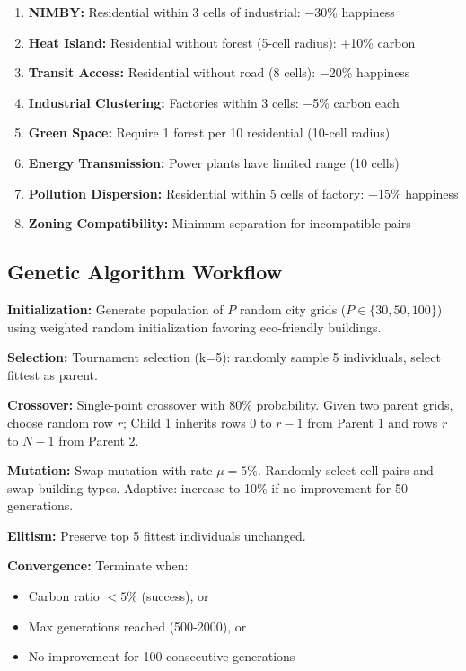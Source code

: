 \documentclass[conference]{IEEEtran}
\begin{document}
\begin{enumerate}
    \item \textbf{NIMBY:} Residential within 3 cells of industrial: $-$30\% happiness
    \item \textbf{Heat Island:} Residential without forest (5-cell radius): +10\% carbon
    \item \textbf{Transit Access:} Residential without road (8 cells): $-$20\% happiness
    \item \textbf{Industrial Clustering:} Factories within 3 cells: $-$5\% carbon each
    \item \textbf{Green Space:} Require 1 forest per 10 residential (10-cell radius)
    \item \textbf{Energy Transmission:} Power plants have limited range (10 cells)
    \item \textbf{Pollution Dispersion:} Residential within 5 cells of factory: $-$15\% happiness
    \item \textbf{Zoning Compatibility:} Minimum separation for incompatible pairs
\end{enumerate}

\subsection{Genetic Algorithm Workflow}

\textbf{Initialization:} Generate population of $P$ random city grids ($P \in \{30, 50, 100\}$) using weighted random initialization favoring eco-friendly buildings.

\textbf{Selection:} Tournament selection (k=5): randomly sample 5 individuals, select fittest as parent.

\textbf{Crossover:} Single-point crossover with 80\% probability. Given two parent grids, choose random row $r$; Child 1 inherits rows 0 to $r-1$ from Parent 1 and rows $r$ to $N-1$ from Parent 2.

\textbf{Mutation:} Swap mutation with rate $\mu = 5\%$. Randomly select cell pairs and swap building types. Adaptive: increase to 10\% if no improvement for 50 generations.

\textbf{Elitism:} Preserve top 5 fittest individuals unchanged.

\textbf{Convergence:} Terminate when:
\begin{itemize}
    \item Carbon ratio $< 5\%$ (success), or
    \item Max generations reached (500-2000), or
    \item No improvement for 100 consecutive generations
\end{itemize}
\end{document}
